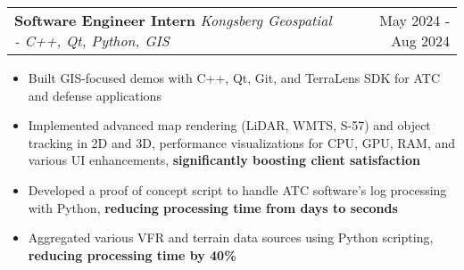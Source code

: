 \documentclass[letterpaper,11pt]{article}
\makeatletter
\newcommand{\resumeItem}[1]{
  \item\small{
    {#1 \vspace{-3pt}}
  }
}
\newcommand{\resumeSubheading}[3]{
    \item
    \begin{tabular*}{0.97\textwidth}[t]{l@{\extracolsep{\fill}}r}
      \textbf{#1} \textbar \textit{ #2} & #3 \\
    \end{tabular*}\vspace{-7.5pt}
}
\newcommand{\resumeItemListStart}{\begin{itemize}}
\newcommand{\resumeItemListEnd}{\end{itemize}\vspace{-5pt}}
\makeatother
\begin{document}

      \resumeSubheading
      {Software Engineer Intern}{Kongsberg Geospatial - C++, Qt, Python, GIS}{May 2024 - Aug 2024}
      \resumeItemListStart
      \resumeItem{Built GIS-focused demos with C++, Qt, Git, and TerraLens SDK for ATC and defense applications}
      \resumeItem{Implemented advanced map rendering (LiDAR, WMTS, S-57) and object tracking in 2D and 3D, performance visualizations for CPU, GPU, RAM, and various UI enhancements, \textbf{significantly boosting client satisfaction}}
        \resumeItem{Developed a proof of concept script to handle ATC software's log processing with Python, \textbf{reducing processing time from days to seconds}}
        \resumeItem{Aggregated various VFR and terrain data sources using Python scripting, \textbf{reducing processing time by 40\%}}
      \resumeItemListEnd
\end{document}
